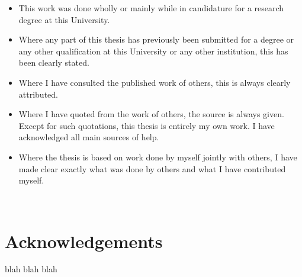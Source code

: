 \documentclass[a4paper,12pt]{report}
\newcommand{\linespacing}{1.5}
\renewcommand{\baselinestretch}{\linespacing}
\begin{document}
\begin{itemize}
	\item This work was done wholly or mainly while in candidature for
	a research degree at this University.
	\item Where any part of this thesis has previously been submitted for a degree
	or any other qualification at this University or any other institution,
	this has been clearly stated.
	\item Where I have consulted the published work of others, this is always
	clearly attributed.
	\item Where I have quoted from the work of others, the source is always
	given. Except for such quotations, this thesis is entirely my own work.
	I have acknowledged all main sources of help.
	\item Where the thesis is based on work done by myself jointly with others,
	I have made clear exactly what was done by others and what I have
	contributed myself.
\end{itemize}

\vskip5mm
\underline{}\\

\underline{}


\chapter*{Acknowledgements}
blah blah blah





\newpage
{}
\tableofcontents
\listoftables
{}
{}
\listoffigures
{}
{}
\end{document}
